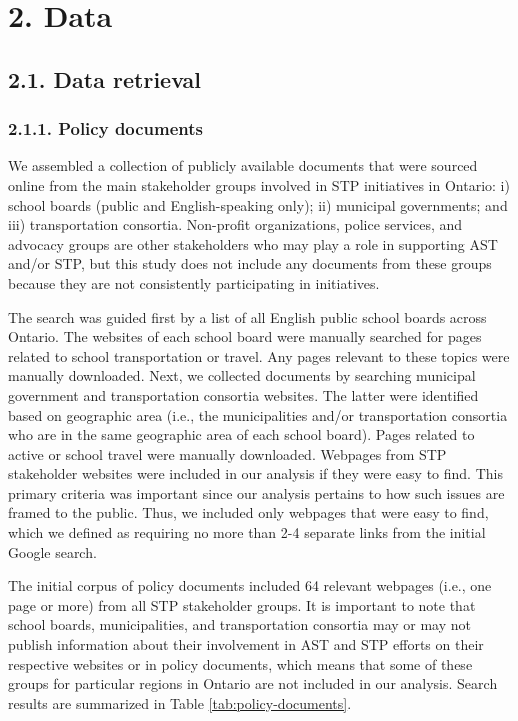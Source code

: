 \documentclass[]{elsarticle} %
\begin{document}
\hypertarget{data}{%
\section{2. Data}\label{data}}

\hypertarget{data-retrieval}{%
\subsection{2.1. Data retrieval}\label{data-retrieval}}

\hypertarget{policy-documents}{%
\subsubsection{2.1.1. Policy documents}\label{policy-documents}}

We assembled a collection of publicly available documents that were
sourced online from the main stakeholder groups involved in STP
initiatives in Ontario: i) school boards (public and English-speaking
only); ii) municipal governments; and iii) transportation consortia.
Non-profit organizations, police services, and advocacy groups are other
stakeholders who may play a role in supporting AST and/or STP, but this
study does not include any documents from these groups because they are
not consistently participating in initiatives.

The search was guided first by a list of all English public school
boards across Ontario. The websites of each school board were manually
searched for pages related to school transportation or travel. Any pages
relevant to these topics were manually downloaded. Next, we collected
documents by searching municipal government and transportation consortia
websites. The latter were identified based on geographic area (i.e., the
municipalities and/or transportation consortia who are in the same
geographic area of each school board). Pages related to active or school
travel were manually downloaded. Webpages from STP stakeholder websites
were included in our analysis if they were easy to find. This primary
criteria was important since our analysis pertains to how such issues
are framed to the public. Thus, we included only webpages that were easy
to find, which we defined as requiring no more than 2-4 separate links
from the initial Google search.

The initial corpus of policy documents included 64 relevant webpages
(i.e., one page or more) from all STP stakeholder groups. It is
important to note that school boards, municipalities, and transportation
consortia may or may not publish information about their involvement in
AST and STP efforts on their respective websites or in policy documents,
which means that some of these groups for particular regions in Ontario
are not included in our analysis. Search results are summarized in Table
\ref{tab:policy-documents}.
\end{document}
